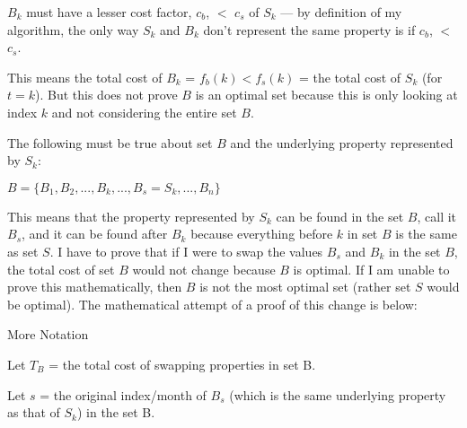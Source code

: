 \documentclass[11pt]{article}
\begin{document}
\begin{flushleft}
\begin{enumerate}
{\begin{enumerate}
{				      					      		      				      				      $B_k$ must have a lesser cost factor, $c_b$, $<$ $c_s$ of $S_k$ --- by definition of my algorithm, the only way $S_k$ and $B_k$ don't represent the same property is if $c_b$, $<$ $c_s$.\linebreak
				      					      		      				      				      
				      					      		      				      				      This means the total cost of $B_k$ = $f_b(k) < f_s(k)$ = the total cost of $S_k$ (for $t = k$). But this does not prove $B$ is an optimal set because this is only looking at index $k$ and not considering the entire set $B$.\linebreak
				      					      		      				      				      
				      					      		      				      				      
				      					      		      				      				      The following must be true about set $B$ and the underlying property represented by $S_k$:
				      					      		      				      				      \begin{center}
				      					      		      				      				      	$B = \{ B_1, B_2, ..., B_k, ..., B_s = S_k, ..., B_n \}$
				      					      		      				      				      \end{center}
				      					      		      				      				      This means that the property represented by $S_k$ can be found in the set $B$, call it $B_s$, and it can be found after $B_k$ because everything before $k$ in set $B$ is the same as set $S$. I have to prove that if I were to swap the values $B_s$ and $B_k$ in the set $B$, the total cost of set $B$ would not change because $B$ is optimal. If I am unable to prove this mathematically, then $B$ is not the most optimal set (rather set $S$ would be optimal). The mathematical attempt of a proof of this change is below:\linebreak 
				      					      		      				      				      
				      					      		      				      				      \begin{normalsize}
				      					      		      				      				      	More Notation
				      					      		      				      				      \end{normalsize}
				      					      		      				      				      \begin{center}
				      					      		      				      				      	Let $T_B$ = the total cost of swapping properties in set B.
				      					      		      				      				      	
				      					      		      				      				      	Let $s$ = the original index/month of $B_s$ (which is the same underlying property as that of $S_k$) in the set B.
				      					      		      				      				      	

\end{center}}
\end{enumerate}}
\end{enumerate}
\end{flushleft}
\end{document}
